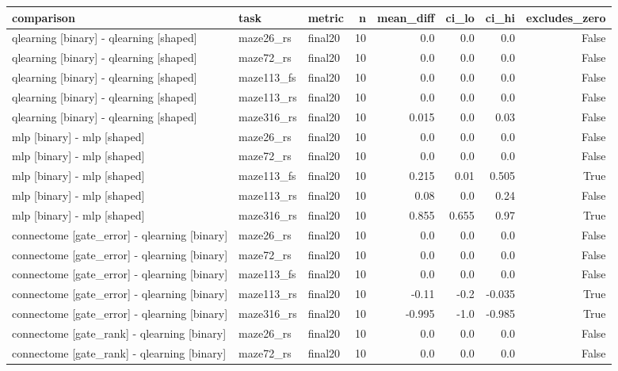 \begin{table}[t]
\centering
\small
\begin{tabular}{lllrrrrr}
\toprule
comparison & task & metric & n & mean\_diff & ci\_lo & ci\_hi & excludes\_zero \\
\midrule
qlearning [binary] - qlearning [shaped] & maze26\_rs & final20 & 10 & 0.0 & 0.0 & 0.0 & False \\
qlearning [binary] - qlearning [shaped] & maze72\_rs & final20 & 10 & 0.0 & 0.0 & 0.0 & False \\
qlearning [binary] - qlearning [shaped] & maze113\_fs & final20 & 10 & 0.0 & 0.0 & 0.0 & False \\
qlearning [binary] - qlearning [shaped] & maze113\_rs & final20 & 10 & 0.0 & 0.0 & 0.0 & False \\
qlearning [binary] - qlearning [shaped] & maze316\_rs & final20 & 10 & 0.015 & 0.0 & 0.03 & False \\
mlp [binary] - mlp [shaped] & maze26\_rs & final20 & 10 & 0.0 & 0.0 & 0.0 & False \\
mlp [binary] - mlp [shaped] & maze72\_rs & final20 & 10 & 0.0 & 0.0 & 0.0 & False \\
mlp [binary] - mlp [shaped] & maze113\_fs & final20 & 10 & 0.215 & 0.01 & 0.505 & True \\
mlp [binary] - mlp [shaped] & maze113\_rs & final20 & 10 & 0.08 & 0.0 & 0.24 & False \\
mlp [binary] - mlp [shaped] & maze316\_rs & final20 & 10 & 0.855 & 0.655 & 0.97 & True \\
connectome [gate\_error] - qlearning [binary] & maze26\_rs & final20 & 10 & 0.0 & 0.0 & 0.0 & False \\
connectome [gate\_error] - qlearning [binary] & maze72\_rs & final20 & 10 & 0.0 & 0.0 & 0.0 & False \\
connectome [gate\_error] - qlearning [binary] & maze113\_fs & final20 & 10 & 0.0 & 0.0 & 0.0 & False \\
connectome [gate\_error] - qlearning [binary] & maze113\_rs & final20 & 10 & -0.11 & -0.2 & -0.035 & True \\
connectome [gate\_error] - qlearning [binary] & maze316\_rs & final20 & 10 & -0.995 & -1.0 & -0.985 & True \\
connectome [gate\_rank] - qlearning [binary] & maze26\_rs & final20 & 10 & 0.0 & 0.0 & 0.0 & False \\
connectome [gate\_rank] - qlearning [binary] & maze72\_rs & final20 & 10 & 0.0 & 0.0 & 0.0 & False \\

\end{tabular}
\end{table}
